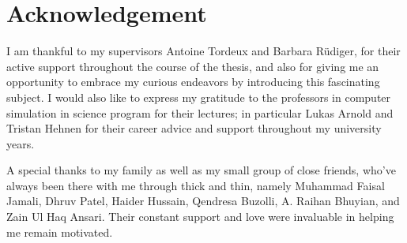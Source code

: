 \section*{Acknowledgement}

I am thankful to my supervisors Antoine Tordeux and Barbara Rüdiger, for their active support throughout the course of the thesis, and also for giving me an opportunity to embrace my curious endeavors by introducing this fascinating subject. I would also like to express my gratitude to the professors in computer simulation in science program for their lectures; in particular Lukas Arnold and Tristan Hehnen for their career advice and support throughout my university years.

A special thanks to my family as well as my small group of close friends, who've always been there with me through thick and thin, namely Muhammad Faisal Jamali, Dhruv Patel, Haider Hussain, Qendresa Buzolli, A. Raihan Bhuyian, and Zain Ul Haq Ansari. Their constant support and love were invaluable in helping me remain motivated.